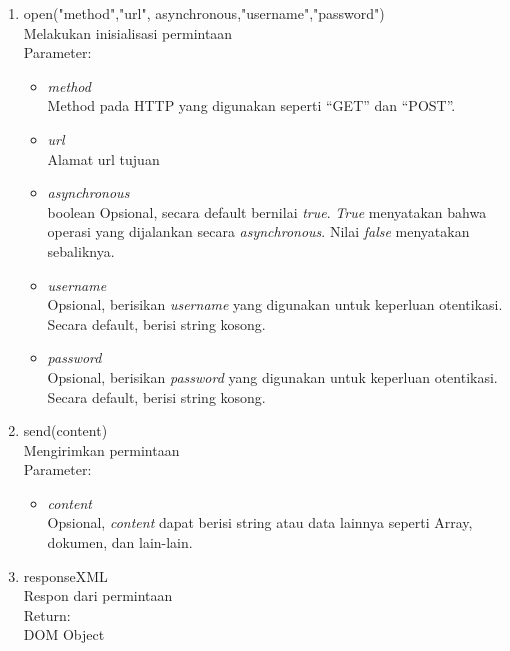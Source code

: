 \begin{enumerate}
  \item open("method","url", asynchronous,"username","password")\\
  Melakukan inisialisasi permintaan\\
	Parameter:
  \begin{itemize}
    \item \textit{method}\\
    Method pada HTTP yang digunakan seperti ``GET'' dan ``POST''.
    
    \item \textit{url}\\
    Alamat url tujuan 
    
    \item \textit{asynchronous}\\
    boolean Opsional, secara default bernilai \textit{true}. \textit{True}
    menyatakan bahwa operasi yang dijalankan secara \textit{asynchronous}. Nilai
    \textit{false} menyatakan sebaliknya.
    
    \item \textit{username}\\
    Opsional, berisikan \textit{username} yang digunakan untuk keperluan
    otentikasi.
    Secara default, berisi string kosong.
    
    \item \textit{password}\\
    Opsional, berisikan \textit{password} yang digunakan untuk keperluan
    otentikasi. Secara default, berisi string kosong.
  \end{itemize}
  
  \item send(content)\\
  Mengirimkan permintaan\\
  Parameter:
  \begin{itemize}
    \item \textit{content}\\
    Opsional, \textit{content} dapat berisi string atau data lainnya seperti
    Array, dokumen, dan lain-lain.
  \end{itemize}
  
  \item responseXML\\
  Respon dari permintaan\\
  Return:\\
  DOM Object
\end{enumerate}


